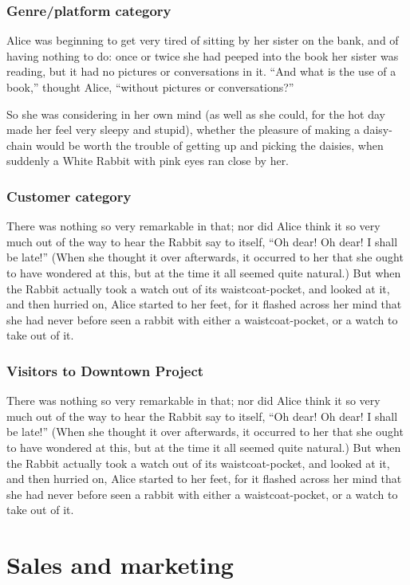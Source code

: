 \documentclass[12pt]{article}
\begin{document}
\subsubsection{Genre/platform category}
\label{sec-3-3-1}
Alice was beginning to get very tired of sitting by her sister on the bank, and of having nothing to do: once or twice she had peeped into the book her sister was reading, but it had no pictures or conversations in it. ``And what is the use of a book,'' thought Alice, ``without pictures or conversations?'' 

So she was considering in her own mind (as well as she could, for the hot day made her feel very sleepy and stupid), whether the pleasure of making a daisy-chain would be worth the trouble of getting up and picking the daisies, when suddenly a White Rabbit with pink eyes ran close by her.

\subsubsection{Customer category}
\label{sec-3-3-2}
There was nothing so very remarkable in that; nor did Alice think it so very much out of the way to hear the Rabbit say to itself, ``Oh dear! Oh dear! I shall be late!'' (When she thought it over afterwards, it occurred to her that she ought to have wondered at this, but at the time it all seemed quite natural.) But when the Rabbit actually took a watch out of its waistcoat-pocket, and looked at it, and then hurried on, Alice started to her feet, for it flashed across her mind that she had never before seen a rabbit with either a waistcoat-pocket, or a watch to take out of it. 

\subsubsection{Visitors to Downtown Project}
\label{sec-3-3-3}
There was nothing so very remarkable in that; nor did Alice think it so very much out of the way to hear the Rabbit say to itself, ``Oh dear! Oh dear! I shall be late!'' (When she thought it over afterwards, it occurred to her that she ought to have wondered at this, but at the time it all seemed quite natural.) But when the Rabbit actually took a watch out of its waistcoat-pocket, and looked at it, and then hurried on, Alice started to her feet, for it flashed across her mind that she had never before seen a rabbit with either a waistcoat-pocket, or a watch to take out of it. 

\section{Sales and marketing}
\label{sec-4}
\end{document}
